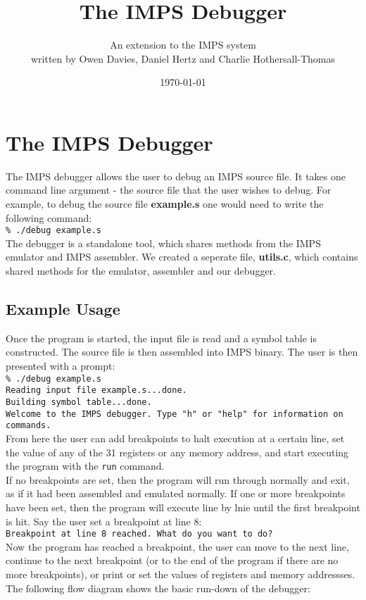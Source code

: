 \documentclass[11pt]{report}
\begin{document}
\setlength{\topmargin}{-1cm} %
\title{The IMPS Debugger}
\author{An extension to the IMPS system\\written by Owen Davies, Daniel Hertz and Charlie Hothersall-Thomas}
\date{ \today}

\maketitle
\section*{The IMPS Debugger} %

The IMPS debugger allows the user to debug an IMPS source file. It takes one 
command line argument - the source file that the user wishes to debug. For 
example, to debug the source file \textbf{example.s} one would need to write 
the following command:
\\[1ex]
\texttt{\% ./debug example.s}
\\[1ex]
The debugger is a standalone tool, which shares methods from the IMPS emulator 
and IMPS assembler. We created a seperate file, \textbf{utils.c}, which contains 
shared methods for the emulator, assembler and our debugger.

\subsection*{Example Usage}

Once the program is started, the input file is read and a symbol table is 
constructed. The source file is then assembled into IMPS binary. The user is 
then presented with a prompt:
\\[1ex]
\texttt{\% ./debug example.s\\
		Reading input file example.s...done.\\
		Building symbol table...done.\\
		Welcome to the IMPS debugger. Type "h" or "help" for information on commands.}
\\[1ex]
From here the user can add breakpoints to halt execution at a certain line, set 
the value of any of the 31 registers or any memory address, and start executing 
the program with the \texttt{run} command.\\
If no breakpoints are set, then the program will run through normally and exit, 
as if it had been assembled and emulated normally. If one or more breakpoints 
have been set, then the program will execute line by lnie until the first 
breakpoint is hit. Say the user set a breakpoint at line 8:
\\[1ex]
\texttt{Breakpoint at line 8 reached. What do you want to do?}
\\[1ex]
Now the program has reached a breakpoint, the user can move to the next line, 
continue to the next breakpoint (or to the end of the program if there are no 
more breakpoints), or print or set the values of registers and memory 
addressses.
\newpage
The following flow diagram shows the basic run-down of the debugger:
\end{document}
